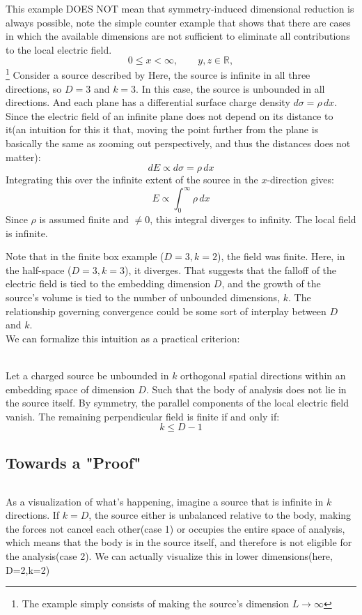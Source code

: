 \documentclass[12pt]{article}
\begin{document}
This example DOES NOT mean that symmetry-induced dimensional reduction is always possible, note the simple counter example that shows that there are cases in which the available dimensions are not sufficient to eliminate all contributions to the local electric field.
\[
0\leq x<\infty,
\qquad
y,z\in\mathbb{R},
\]
\footnote{The example simply consists of making the source's dimension $L\rightarrow\infty$}
Consider a source described by
Here, the source is infinite in all three directions, so $D=3$ and $k=3$. In this case, the source is unbounded in all directions. And each plane has a differential surface charge density $d\sigma = \rho\,dx$. Since the electric field of an infinite plane does not depend on its distance to it(an intuition for this it that, moving the point further from the plane is basically the same as zooming out perspectively, and thus the distances does not matter):
\[
dE \propto d\sigma = \rho\,dx
\]
Integrating this over the infinite extent of the source in the $x$-direction gives:
\[
E \propto \int_0^\infty \rho\,dx
\]
Since $\rho$ is assumed finite and $\neq 0$, this integral diverges to infinity. The local field is infinite.

Note that in the finite box example ($D=3, k=2$), the field was finite. Here, in the half-space ($D=3, k=3$), it diverges. That suggests that the falloff of the electric field is tied to the embedding dimension $D$, and the growth of the source's volume is tied to the number of unbounded dimensions, $k$. The relationship governing convergence could be some sort of interplay between $D$ and $k$. 
\[\]
We can formalize this intuition as a practical criterion:\\
\begin{conjecture}
\label{thm:convergence}
\\
Let a charged source be unbounded in $k$ orthogonal spatial directions within an embedding space of dimension $D$. Such that the body of analysis does not lie in the source itself. By symmetry, the parallel components of the local electric field vanish. The remaining perpendicular field is finite if and only if:
\[
\boxed{k \leq D - 1}
\]
\end{conjecture}

\subsection{Towards a "Proof"}


\[\]

As a visualization of what's happening, imagine a source that is infinite in $k$ directions. If $k = D$, the source either is unbalanced relative to the body, making the forces not cancel each other(case 1) or occupies the entire space of analysis, which means that the body is in the source itself, and therefore is not eligible for the analysis(case 2).
We can actually visualize this in lower dimensions(here, D=2,k=2)
\end{document}
